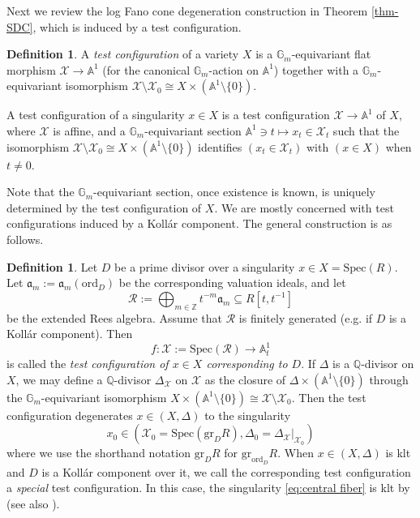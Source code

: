 \documentclass[12pt]{amsart}
\theoremstyle{definition}
\newtheorem{defn}[prop]{Definition}
\newcommand{\bA}{\mathbb{A}}
\newcommand{\bQ}{\mathbb{Q}}
\newcommand{\bZ}{\mathbb{Z}}
\newcommand{\bG}{\mathbb{G}}
\newcommand{\cR}{\mathcal{R}}
\newcommand{\scX}{\mathscr{X}}
\newcommand{\fa}{\mathfrak{a}}
\newcommand{\Spec}{\mathrm{Spec}}
\newcommand{\ord}{\mathrm{ord}}
\newcommand{\gr}{\mathrm{gr}}
\numberwithin{equation}{section}
\begin{document}
Next we review the log Fano cone degeneration construction in Theorem \ref{thm-SDC}, which is induced by a test configuration.

\begin{defn}\label{defn-testconfiguration}
A \emph{test configuration} of a variety $X$ is a $\bG_m$-equivariant flat morphism $\scX\to \bA^1$ (for the canonical $\bG_m$-action on $\bA^1$) together with a $\bG_m$-equivariant isomorphism $\scX\setminus \scX_0\cong X \times (\bA^1\setminus\{0\})$. 

A test configuration of a singularity $x\in X$ is a test configuration $\scX\to \bA^1$ of $X$, where $\scX$ is affine, and a $\mathbb G_m$-equivariant section $\bA^1\ni t\mapsto x_t\in \scX_t$ such that the isomorphism $\scX\setminus \scX_0\cong X \times (\bA^1\setminus\{0\})$ identifies $(x_t\in \scX_t)$ with $(x\in X)$ when $t\neq 0$.

\end{defn}

Note that the $\bG_m$-equivariant section, once existence is known, is uniquely determined by the test configuration of $X$. We are mostly concerned with test configurations induced by a Koll\'ar component. The general construction is as follows.

\begin{defn} \label{def:TC}
Let $D$ be a prime divisor over a singularity $x\in X = \Spec(R)$. Let $\fa_m:=\fa_m(\ord_D)$ be the corresponding valuation ideals, and let
\begin{equation} \label{eq:extended Rees}
\cR:=\bigoplus_{m\in\bZ} t^{-m} \fa_m \subseteq R[t,t^{-1}]
\end{equation}
be the extended Rees algebra. Assume that $\cR$ is finitely generated (e.g. if $D$ is a Koll\'ar component). Then
\[
f\colon \scX:=\Spec(\cR)\to \bA^1_t
\]
is called the \emph{test configuration of $x\in X$ corresponding to $D$}. If $\Delta$ is a $\bQ$-divisor on $X$, we may define a $\bQ$-divisor $\Delta_{\scX}$ on $\scX$ as the closure of $\Delta\times (\bA^1\setminus\{0\})$ through the $\bG_m$-equivariant isomorphism $X\times (\bA^1\setminus\{0\})\cong \scX\setminus \scX_0$. Then the test configuration degenerates $x\in (X,\Delta)$ to the singularity
\begin{equation} \label{eq:central fiber}
x_0\in (\scX_0 = \Spec(\gr_D R),\Delta_0=\Delta_{\scX}|_{\scX_0})
\end{equation}
where we use the shorthand notation $\gr_D R$ for $\gr_{\ord_D} R$. When $x\in (X,\Delta)$ is klt and $D$ is a Koll\'ar component over it, we call the corresponding test configuration a \emph{special} test configuration. In this case, the singularity \eqref{eq:central fiber} is klt by \cite[Theorem 4.1]{XZ-SDC} (see also \cite[Section 2.4]{LX-Kol-comp-stab}).
\end{defn}
\end{document}
